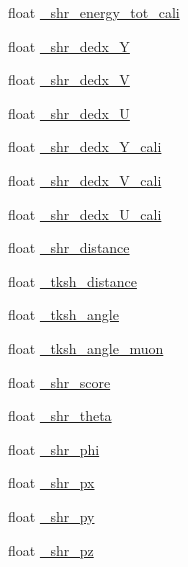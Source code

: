 \begin{DoxyCompactItemize}
float \hyperlink{classselection_1_1CC0piNpSelection_aae69f88600d31bb3456808268fb63c1c}{\+\_\+shr\+\_\+energy\+\_\+tot\+\_\+cali}
\item 
float \hyperlink{classselection_1_1CC0piNpSelection_a1af96c31bd3afe4b111f429927bbff1c}{\+\_\+shr\+\_\+dedx\+\_\+Y}
\item 
float \hyperlink{classselection_1_1CC0piNpSelection_a392211f6d023d92bf113c20098c5e7fe}{\+\_\+shr\+\_\+dedx\+\_\+V}
\item 
float \hyperlink{classselection_1_1CC0piNpSelection_ada2f72c2f814e7d06c24a50ff5ad4fcc}{\+\_\+shr\+\_\+dedx\+\_\+U}
\item 
float \hyperlink{classselection_1_1CC0piNpSelection_a114f4276a8931d33d8f77fede58398fa}{\+\_\+shr\+\_\+dedx\+\_\+\+Y\+\_\+cali}
\item 
float \hyperlink{classselection_1_1CC0piNpSelection_a0ef852fb0ecd8a3b6f871ed765be12da}{\+\_\+shr\+\_\+dedx\+\_\+\+V\+\_\+cali}
\item 
float \hyperlink{classselection_1_1CC0piNpSelection_a7c90820db5398c179aef3186ab11e521}{\+\_\+shr\+\_\+dedx\+\_\+\+U\+\_\+cali}
\item 
float \hyperlink{classselection_1_1CC0piNpSelection_a20705dc212e16009a0ce4ace27d54af7}{\+\_\+shr\+\_\+distance}
\item 
float \hyperlink{classselection_1_1CC0piNpSelection_a73d772bb569336b56a3f14cee752e2f3}{\+\_\+tksh\+\_\+distance}
\item 
float \hyperlink{classselection_1_1CC0piNpSelection_a959adc6093ff4d2730dac8f75dd1245c}{\+\_\+tksh\+\_\+angle}
\item 
float \hyperlink{classselection_1_1CC0piNpSelection_a8210028b7144d3dc078201257a1a8663}{\+\_\+tksh\+\_\+angle\+\_\+muon}
\item 
float \hyperlink{classselection_1_1CC0piNpSelection_a9033ad097ef1b7a4e10b2b872b82f068}{\+\_\+shr\+\_\+score}
\item 
float \hyperlink{classselection_1_1CC0piNpSelection_a624a38f7c8d33320df92e610fd0e16ee}{\+\_\+shr\+\_\+theta}
\item 
float \hyperlink{classselection_1_1CC0piNpSelection_a8706a83b3dc2e2c3857ada556392f16f}{\+\_\+shr\+\_\+phi}
\item 
float \hyperlink{classselection_1_1CC0piNpSelection_a52e2043c82f5de7f93ac9bad63563f18}{\+\_\+shr\+\_\+px}
\item 
float \hyperlink{classselection_1_1CC0piNpSelection_a436dd7081c84003dabb595289d745111}{\+\_\+shr\+\_\+py}
\item 
float \hyperlink{classselection_1_1CC0piNpSelection_a769319ad32b6ce49c7a5283b246303fa}{\+\_\+shr\+\_\+pz}

\end{DoxyCompactItemize}

